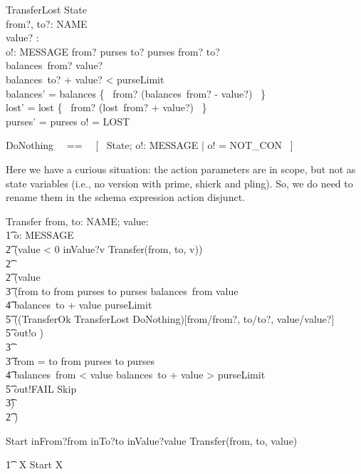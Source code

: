 \documentclass{article}
\begin{document}
\begin{schema}{TransferLost}
   \Delta State \\
   from?, to?: NAME \\
   value? : \nat \\
   o!: MESSAGE
\where
   from? \in purses \land  to? \in purses \land from? \neq to? \\
   balances~from? \geq value? \\
   balances~to? + value? < purseLimit \\
   balances' = balances \oplus \{~ from? \mapsto (balances~from? - value?) ~\} \\   
   lost' = lost  \oplus \{~ from? \mapsto (lost~from? + value?) ~\} \\
   purses' = purses \land o! = LOST
\end{schema}

\begin{zed}
   DoNothing ~~==~~ [~ \Xi State; o!: MESSAGE | o! = NOT\_CON ~]
\end{zed}

Here we have a curious situation: the action parameters are in scope, but not 
as state variables (i.e., no version with prime, shierk and pling). So, we do need
to rename them in the schema expression action disjunct.
%
\begin{circusaction}
    Transfer \circdef from, to: NAME; value: \nat \circspot \\
    	\t1 \circvar o: MESSAGE \circspot \\
		\t2 (\lcircguard value < 0 \rcircguard \circguard inValue?v \then Transfer(from, to, v)) \\
		\t2 \extchoice \\
		\t2 (\lcircguard value  \rcircguard \circguard \\
			\t3 (\lcircguard from \neq to \land from \in purses \land to \in purses \land balances~from \geq value \\
				\t4 \land balances~to + value \leq purseLimit \rcircguard \circguard \\
					\t5 (\lschexpract (TransferOk \lor TransferLost \lor DoNothing)[from/from?, to/to?, value/value?] \rschexpract \circseq \\
					\t5 out!o \then \Skip) \\
			\t3 \extchoice \\
			 \t3  \lcircguard from = to \lor from \notin purses \lor to \notin purses \lor \\
			 	\t4  balances~from < value \lor balances~to + value > purseLimit \rcircguard \circguard \\
					\t5 out!FAIL \then Skip \\
			 \t3) \\
	        \t2 )
\end{circusaction}

\begin{circusaction}
     Start \circdef inFrom?from \then inTo?to \then inValue?value \then Transfer(from, to, value)
\end{circusaction}

\begin{circusaction}
   \t1 \circspot \circmu\ X \circspot Start \circseq X
\end{circusaction}
   
\begin{circus}
   \circend
\end{circus}
\end{document}
